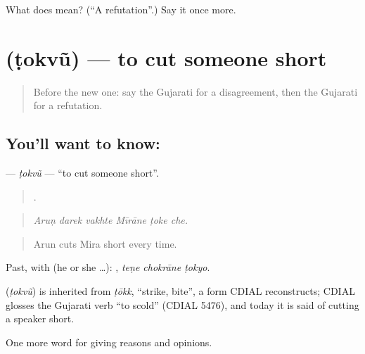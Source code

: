 \begin{tcolorbox}[breakable,colback=teal!4,colframe=teal!35!black,title={Before you move on}]
What does  mean? (\textquotedblleft{}A refutation\textquotedblright{}.) Say it once more.
\end{tcolorbox}
\section[\texorpdfstring{\gu{ટોકવું} (ṭokvũ)}{ટોકવું (ṭokvũ)}]{ (ṭokvũ) — to cut someone short}

\label{lesson:GU-C342-tokvu}



\begin{quote}
Before the new one: say the Gujarati for a disagreement, then the Gujarati for a refutation.
\end{quote}

\subsection*{You'll want to know: }
\textbf{} — \emph{ṭokvũ} — \textquotedblleft{}to cut someone short\textquotedblright{}.

\begin{quote}
     .
\end{quote}

\begin{quote}
\emph{Aruṇ darek vakhte Mīrāne ṭoke che.}
\end{quote}

\begin{quote}
Arun cuts Mira short every time.
\end{quote}

Past, with  (he or she …):   , \emph{teṇe chokrāne ṭokyo}.

\begin{cousinweb}
\textbf{} (\emph{ṭokvũ}) is inherited from \emph{ṭōkk}, \textquotedblleft{}strike, bite\textquotedblright{}, a form CDIAL reconstructs; CDIAL glosses the Gujarati verb \textquotedblleft{}to scold\textquotedblright{} (CDIAL 5476), and today it is said of cutting a speaker short.
\end{cousinweb}

\begin{grammarlens}[title={What you've built}]
One more word for giving reasons and opinions.
\end{grammarlens}

